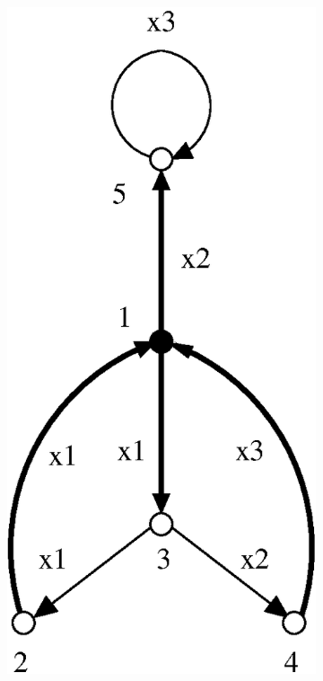 \documentclass[a4paper,12pt]{article}
\numberwithin{equation}{section}
\numberwithin{figure}{section}
\begin{document}
\begin{figure}
\begin{center}
\begin{subfigure}[b]{.25\columnwidth}
\includegraphics[scale=.52]{stallh1.eps}

\end{subfigure}
\end{center}
\end{figure}
\end{document}
